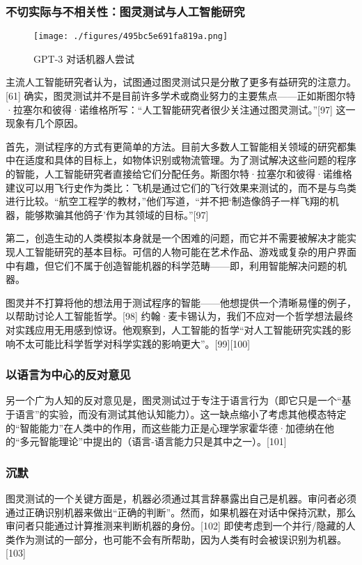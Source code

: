 \subsubsection{不切实际与不相关性：图灵测试与人工智能研究}
\begin{figure}[ht]
\centering
\texttt{[image: ./figures/495bc5e691fa819a.png]}
\caption{GPT-3 对话机器人尝试} \label{fig_TLCS_5}
\end{figure}
主流人工智能研究者认为，试图通过图灵测试只是分散了更多有益研究的注意力。[61] 确实，图灵测试并不是目前许多学术或商业努力的主要焦点——正如斯图尔特·拉塞尔和彼得·诺维格所写：“人工智能研究者很少关注通过图灵测试。”[97] 这一现象有几个原因。

首先，测试程序的方式有更简单的方法。目前大多数人工智能相关领域的研究都集中在适度和具体的目标上，如物体识别或物流管理。为了测试解决这些问题的程序的智能，人工智能研究者直接给它们分配任务。斯图尔特·拉塞尔和彼得·诺维格建议可以用飞行史作为类比：飞机是通过它们的飞行效果来测试的，而不是与鸟类进行比较。“航空工程学的教材，”他们写道，“并不把‘制造像鸽子一样飞翔的机器，能够欺骗其他鸽子’作为其领域的目标。”[97]

第二，创造生动的人类模拟本身就是一个困难的问题，而它并不需要被解决才能实现人工智能研究的基本目标。可信的人物可能在艺术作品、游戏或复杂的用户界面中有趣，但它们不属于创造智能机器的科学范畴——即，利用智能解决问题的机器。

图灵并不打算将他的想法用于测试程序的智能——他想提供一个清晰易懂的例子，以帮助讨论人工智能哲学。[98] 约翰·麦卡锡认为，我们不应对一个哲学想法最终对实践应用无用感到惊讶。他观察到，人工智能的哲学“对人工智能研究实践的影响不太可能比科学哲学对科学实践的影响更大”。[99][100]
\subsubsection{以语言为中心的反对意见}
另一个广为人知的反对意见是，图灵测试过于专注于语言行为（即它只是一个“基于语言”的实验，而没有测试其他认知能力）。这一缺点缩小了考虑其他模态特定的“智能能力”在人类中的作用，而这些能力正是心理学家霍华德·加德纳在他的“多元智能理论”中提出的（语言-语言能力只是其中之一）。[101]
\subsubsection{沉默}
图灵测试的一个关键方面是，机器必须通过其言辞暴露出自己是机器。审问者必须通过正确识别机器来做出“正确的判断”。然而，如果机器在对话中保持沉默，那么审问者只能通过计算推测来判断机器的身份。[102] 即使考虑到一个并行/隐藏的人类作为测试的一部分，也可能不会有所帮助，因为人类有时会被误识别为机器。[103]
